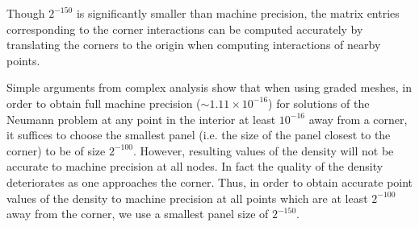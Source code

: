 \begin{rem}
Though $2^{-150}$ is significantly smaller than machine precision, the matrix entries corresponding to the
corner interactions can be computed accurately by translating the corners to the origin when 
computing interactions of nearby points.
\end{rem} 
\begin{rem}
Simple arguments from complex analysis show that when using graded meshes, in order to obtain full 
machine precision 
($\sim 1.11 \times 10^{-16}$) for solutions of the Neumann problem at any point in the interior 
at least $10^{-16}$ away from a corner, it suffices to choose the smallest panel (i.e. the size of the 
panel closest to the corner) to be of size $2^{-100}.$ However, resulting values of the density will not be 
accurate to machine precision at all nodes. In fact the quality
of the density deteriorates as one approaches the corner. Thus, in order to obtain accurate point values
of the density to machine precision at all points which are at least $2^{-100}$ away from the corner, we use a smallest
panel size of $2^{-150}$. 
\end{rem}


